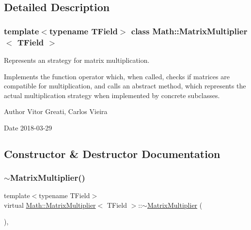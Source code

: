 \subsection{Detailed Description}
\subsubsection*{template$<$typename T\+Field$>$\newline
class Math\+::\+Matrix\+Multiplier$<$ T\+Field $>$}

Represents an strategy for matrix multiplication. 

Implements the function operator which, when called, checks if matrices are compatible for multiplication, and calls an abstract method, which represents the actual multiplication strategy when implemented by concrete subclasses.

\begin{DoxyAuthor}{Author}
Vitor Greati, Carlos Vieira 
\end{DoxyAuthor}
\begin{DoxyDate}{Date}
2018-\/03-\/29 
\end{DoxyDate}


\subsection{Constructor \& Destructor Documentation}
\mbox{\label{classMath_1_1MatrixMultiplier_af43501cad28dfd11f8dd73dc25edd51b}} 
\subsubsection{\texorpdfstring{$\sim$\+Matrix\+Multiplier()}{~MatrixMultiplier()}}
{\footnotesize\ttfamily template$<$typename T\+Field$>$ \\
virtual \mbox{\hyperlink{classMath_1_1MatrixMultiplier}{Math\+::\+Matrix\+Multiplier}}$<$ T\+Field $>$\+::$\sim$\mbox{\hyperlink{classMath_1_1MatrixMultiplier}{Matrix\+Multiplier}} (\begin{DoxyParamCaption}{ }\end{DoxyParamCaption})\hspace{0.3cm}{\ttfamily [inline]}, {\ttfamily [virtual]}}




